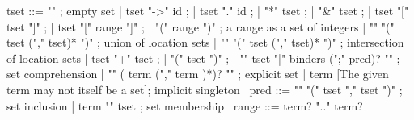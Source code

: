 \begin{syntax}
  tset ::= "\empty" ; empty set
       | tset "->" id ;
       | tset "." id ;
       | "*" tset ;
       | "&" tset ;
       | tset "[" tset "]" ;
       | tset "[" range "]" ;
       | "(" range ")" ; a range as a set of integers
       | "\union" "(" tset ("," tset)* ")" ; union of location sets
       | "\inter" "(" tset ("," tset)* ")" ; intersection of location sets
       | tset "+" tset ;
       | "(" tset ")" ;
       | "{" tset "|" binders (";" pred)? "}" ; set comprehension
       | "{" ( term ("," term )*)? "}" ; explicit set
       | term [The given term may not itself be a set]; implicit singleton
       \
  pred ::= "\subset" "(" tset "," tset ")" ; set inclusion
       | term "\in" tset ; set membership
       \
  range ::= term? ".." term?
\end{syntax}

